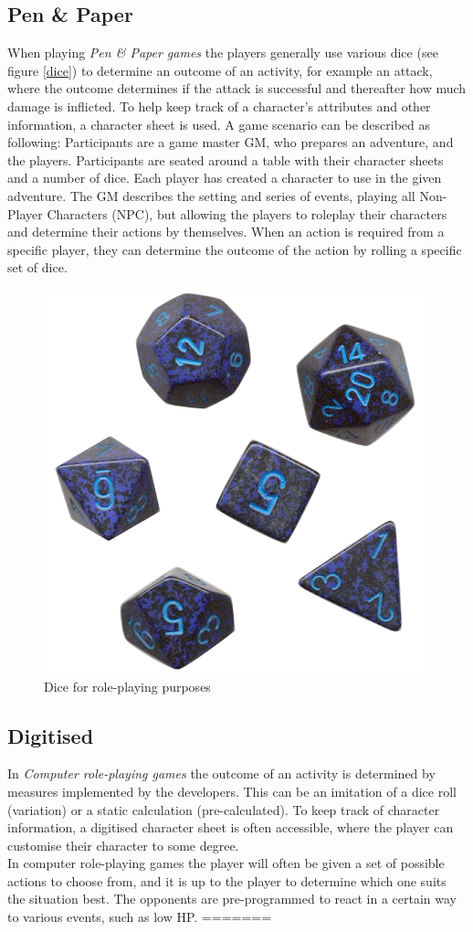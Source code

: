 \subsection*{Pen \& Paper}
When playing \emph{Pen \& Paper games} the players generally use various dice (see figure \vref{dice}) to determine an outcome of an activity, for example an attack, where the outcome determines if the attack is successful and thereafter how much damage is inflicted. To help keep track of a character's attributes and other information, a character sheet is used.
A game scenario can be described as following: Participants are a game master \ac{GM}, who prepares an adventure, and the players. Participants are seated around a table with their character sheets and a number of dice. Each player has created a character to use in the given adventure. The \ac{GM} describes the setting and series of events, playing all Non-Player Characters (NPC), but allowing the players to roleplay their characters and determine their actions by themselves. When an action is required from a specific player, they can determine the outcome of the action by rolling a specific set of dice.
\begin{figure}[!h]
\centering
\includegraphics[scale=0.35]{img/rpgdice.png}
\caption{Dice for role-playing purposes}
\label{dice}
\end{figure}

\subsection*{Digitised}
In \emph{Computer role-playing games} the outcome of an activity is determined by measures implemented by the developers. This can be an imitation of a dice roll (variation) or a static calculation (pre-calculated).
To keep track of character information, a digitised character sheet is often accessible, where the player can customise their character to some degree.\\
In computer role-playing games the player will often be given a set of possible actions to choose from, and it is up to the player to determine which one suits the situation best. The opponents are pre-programmed to react in a certain way to various events, such as low HP.
=======
